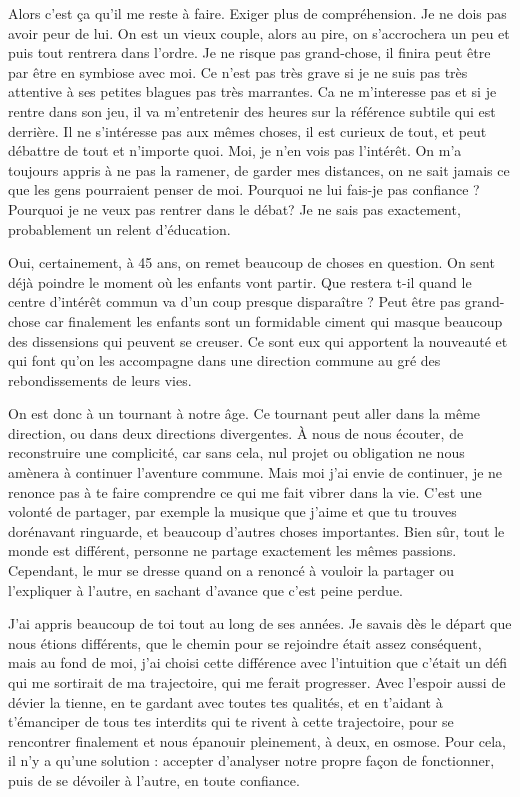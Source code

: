 \documentclass[a4paper,10pt]{letter}
\begin{document}
\begin{letter}{}
Alors c'est ça qu'il me reste à faire. Exiger plus de compréhension.  Je ne dois pas avoir peur de lui. 
On est un vieux couple, alors au pire, on s'accrochera un peu et puis tout rentrera dans l'ordre.
Je ne risque pas grand-chose, il finira peut être par être en symbiose avec moi.
Ce n'est pas très grave si je ne suis pas très attentive à ses petites blagues pas très marrantes. 
Ca ne m'interesse pas et si je rentre dans son jeu, il va m'entretenir des heures sur la référence subtile qui est derrière.
Il ne s'intéresse pas aux mêmes choses, il est curieux de tout, et peut débattre de tout et n'importe quoi.
Moi, je n'en vois pas l'intérêt. On m'a toujours appris à ne pas la ramener, de garder mes distances, on ne sait jamais
ce que les gens pourraient penser de moi. Pourquoi ne lui fais-je pas confiance ? Pourquoi je ne veux pas rentrer dans le débat?
Je ne sais pas exactement, probablement un relent d'éducation.

Oui, certainement, à 45 ans, on remet beaucoup de choses en question. On sent déjà poindre le moment où les enfants vont partir.
Que restera t-il quand le centre d'intérêt commun va d'un coup presque disparaître ?
Peut être pas grand-chose car finalement les enfants sont un formidable ciment qui masque 
beaucoup des dissensions qui peuvent se creuser.
Ce sont eux qui apportent la nouveauté et qui font qu'on les accompagne dans une direction commune au gré des rebondissements de leurs vies.

On est donc à un tournant à notre âge. Ce tournant peut aller dans la même direction, ou dans deux directions divergentes.
À nous de nous écouter, de reconstruire une complicité, car sans cela, nul projet ou obligation ne nous amènera à continuer l'aventure commune.
Mais moi j'ai envie de continuer, je ne renonce pas à te faire comprendre ce qui me fait vibrer dans la vie.
C'est une volonté de partager, par exemple la musique que j'aime et que tu trouves dorénavant ringuarde, 
et beaucoup d'autres choses importantes. Bien sûr, tout le monde est différent, personne ne partage
exactement les mêmes passions. Cependant, le mur se dresse quand on a renoncé à vouloir la partager ou l'expliquer
à l'autre, en sachant d'avance que c'est peine perdue.

J'ai appris beaucoup de toi tout au long de ses années. Je savais dès le départ que nous étions différents, que le chemin
pour se rejoindre était assez conséquent, mais au fond de moi, j'ai choisi cette différence avec l'intuition que c'était un
défi qui me sortirait de ma trajectoire, qui me ferait progresser. 
Avec l'espoir aussi de dévier la tienne, en te gardant avec toutes tes qualités,
et en t'aidant à t'émanciper de tous tes interdits qui te rivent à cette trajectoire, pour 
se rencontrer finalement et nous épanouir pleinement, à deux, en osmose. Pour cela, il n'y a
qu'une solution : accepter d'analyser notre propre façon de fonctionner, puis de se dévoiler à l'autre, 
en toute confiance. 


\end{letter}
\end{document}
